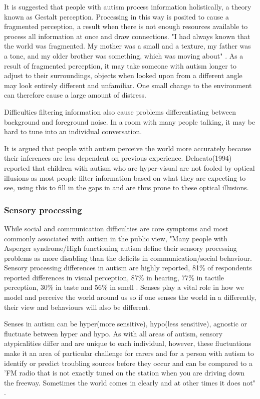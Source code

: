\documentclass[11pt]{report}
\begin{document}
It is suggested that people with autism process information holistically, a theory known as Gestalt perception. Processing in this way is posited to cause a fragmented perception, a result when there is not enough resources available to process all information at once and draw connections. "I had always known that the world was fragmented. My mother was a small and a texture, my father was a tone, and my older brother was something, which was moving about" \cite{williams1992}. As a result of fragmented perception, it may take someone with autism longer to adjust to their surroundings, objects when looked upon from a different angle may look entirely different and unfamiliar. One small change to the environment can therefore cause a large amount of distress.

Difficulties filtering information also cause problems differentiating between background and foreground noise. In a room with many people talking, it may be hard to tune into an individual conversation. 

It is argued that people with autism perceive the world more accurately\cite{bayes} because their inferences are less dependent on previous experience\cite{bayes}. Delacato(1994) reported that children with autism who are hyper-visual are not fooled by optical illusions\cite{bayes} as most people filter information based on what they are expecting to see, using this to fill in the gaps in and are thus prone to these optical illusions. 

\subsubsection{Sensory processing}

While social and communication difficulties are core symptoms and most commonly associated with autism in the public view, "Many people with Asperger syndrome/High functioning autism define their sensory processing problems as more disabling than the deficits in communication/social behaviour. Sensory processing differences in autism are highly reported, 81\% of respondents reported differences in visual perception, 87\% in hearing, 77\% in tactile perception, 30\% in taste and 56\% in smell \cite{olgab}. Senses play a vital role in how we model and perceive the world around us so if one senses the world in a differently, their view and behaviours will also be different. 

Senses in autism can be hyper(more sensitive), hypo(less sensitive), agnostic or fluctuate between hyper and hypo\cite{bayes}. As with all areas of autism, sensory atypicalities differ and are unique to each individual, however, these fluctuations make it an area of particular challenge for carers and for a person with autism to identify or predict troubling sources before they occur and can be compared to a 'FM radio that is not exactly tuned on the station when you are driving down the freeway. Sometimes the world comes in clearly and at other times it does not" \cite{olgab}.
\end{document}
